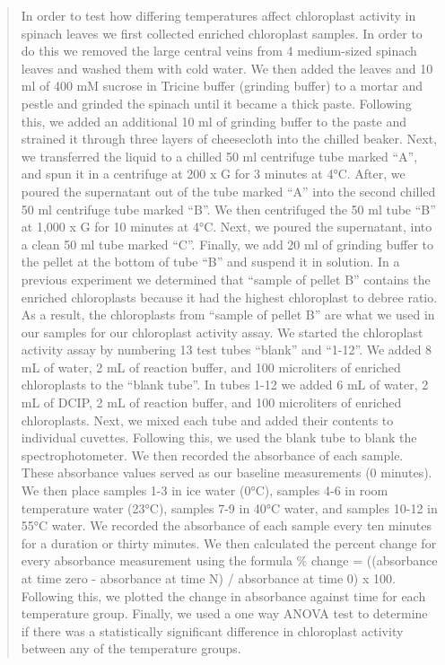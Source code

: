 \documentclass[
]{book}
\begin{document}
\begin{quote}
In order to test how differing temperatures affect chloroplast activity in spinach leaves we first collected enriched chloroplast samples. In order to do this we removed the large central veins from 4 medium-sized spinach leaves and washed them with cold water. We then added the leaves and 10 ml of 400 mM sucrose in Tricine buffer (grinding buffer) to a mortar and pestle and grinded the spinach until it became a thick paste. Following this, we added an additional 10 ml of grinding buffer to the paste and strained it through three layers of cheesecloth into the chilled beaker. Next, we transferred the liquid to a chilled 50 ml centrifuge tube marked ``A'', and spun it in a centrifuge at 200 x G for 3 minutes at 4°C. After, we poured the supernatant out of the tube marked ``A'' into the second chilled 50 ml centrifuge tube marked ``B''. We then centrifuged the 50 ml tube ``B'' at 1,000 x G for 10 minutes at 4°C. Next, we poured the supernatant, into a clean 50 ml tube marked ``C''. Finally, we add 20 ml of grinding buffer to the pellet at the bottom of tube ``B'' and suspend it in solution. In a previous experiment we determined that ``sample of pellet B'' contains the enriched chloroplasts because it had the highest chloroplast to debree ratio. As a result, the chloroplasts from ``sample of pellet B'' are what we used in our samples for our chloroplast activity assay. We started the chloroplast activity assay by numbering 13 test tubes ``blank'' and ``1-12''. We added 8 mL of water, 2 mL of reaction buffer, and 100 microliters of enriched chloroplasts to the ``blank tube''. In tubes 1-12 we added 6 mL of water, 2 mL of DCIP, 2 mL of reaction buffer, and 100 microliters of enriched chloroplasts. Next, we mixed each tube and added their contents to individual cuvettes. Following this, we used the blank tube to blank the spectrophotometer. We then recorded the absorbance of each sample. These absorbance values served as our baseline measurements (0 minutes). We then place samples 1-3 in ice water (0°C), samples 4-6 in room temperature water (23°C), samples 7-9 in 40°C water, and samples 10-12 in 55°C water. We recorded the absorbance of each sample every ten minutes for a duration or thirty minutes. We then calculated the percent change for every absorbance measurement using the formula \% change = ((absorbance at time zero - absorbance at time N) / absorbance at time 0) x 100. Following this, we plotted the change in absorbance against time for each temperature group. Finally, we used a one way ANOVA test to determine if there was a statistically significant difference in chloroplast activity between any of the temperature groups.
\end{quote}
\end{document}
